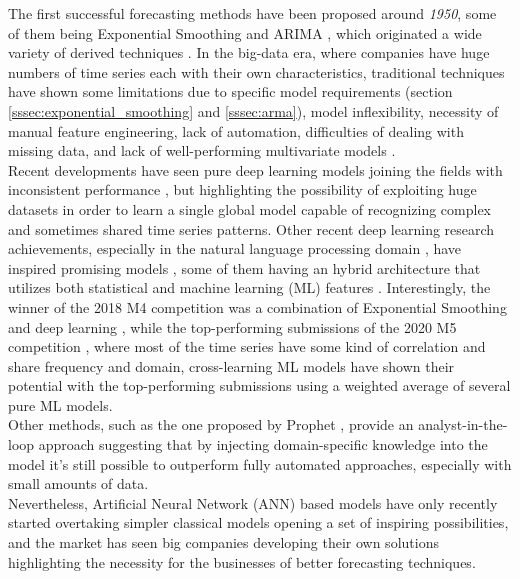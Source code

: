\documentclass[a4paper, 12pt]{article} %
\begin{document}
	The first successful forecasting methods have been proposed around \textit{1950}, some of them being Exponential Smoothing \cite{ExponentialSmoothingHoltCharles} and ARIMA \cite{ForecastingBoxJenkins}, which originated a wide variety of derived techniques \cite{25YearsForecasting}. In the big-data era, where companies have huge numbers of time series each with their own characteristics, traditional techniques have shown some limitations due to specific model requirements (section \ref{sssec:exponential_smoothing} and \ref{sssec:arma}), model inflexibility, necessity of manual feature engineering, lack of automation, difficulties of dealing with missing data, and lack of well-performing multivariate models \cite{25YearsForecasting}.\\
	Recent developments have seen pure deep learning models joining the fields with inconsistent performance \cite{DeepLearningForecastingSurvey}, but highlighting the possibility of exploiting huge datasets in order to learn a single global model capable of recognizing complex and sometimes shared time series patterns. Other recent deep learning research achievements, especially in the natural language processing domain \cite{RNNLSTM, seq2seq, EncoderDecoder}, have inspired promising models \cite{DeepAR, DeepState, DeepLearningForecastingSurvey}, some of them having an hybrid architecture that utilizes both statistical and machine learning (ML) features \cite{MAKRIDAKIS2018802, GluonTS}. 
	Interestingly, the winner of the 2018 M4 competition \cite{MAKRIDAKIS2018802} was a combination of Exponential Smoothing and deep learning \cite{UberHybridES}, while the top-performing submissions of the 2020 M5 competition \cite{M5Competition}, where most of the time series have some kind of correlation and share frequency and domain, cross-learning ML models have shown their potential with the top-performing submissions using a weighted average of several pure ML models.\\
	Other methods, such as the one proposed by Prophet \cite{FacebookProphet}, provide an analyst-in-the-loop approach suggesting that by injecting domain-specific knowledge into the model it's still possible to outperform fully automated approaches, especially with small amounts of data.\\
	Nevertheless, Artificial Neural Network (ANN) based models have only recently started overtaking simpler classical models \cite{MAKRIDAKIS2018802, M5Competition} opening a set of inspiring possibilities, and the market has seen big companies developing their own solutions \cite{FacebookProphet, GluonTS, MicrosoftSSA, UberHybridES} highlighting the necessity for the businesses of better forecasting techniques.
	
\end{document}
